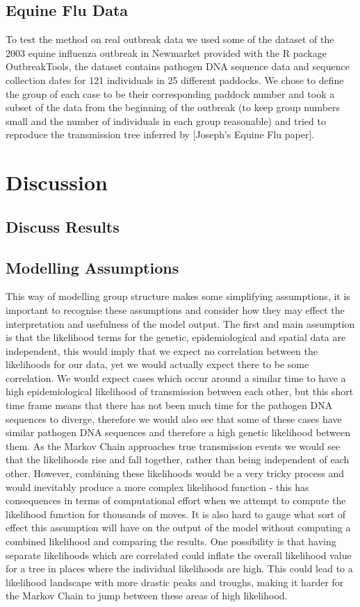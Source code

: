 \documentclass[11pt,a4paper]{report}
\begin{document}
\section{Equine Flu Data}
To test the method on real outbreak data we used some of the dataset of the 2003 equine influenza outbreak in Newmarket provided with the R package OutbreakTools, the dataset contains pathogen DNA sequence data and sequence collection dates for 121 individuals in 25 different paddocks. We chose to define the group of each case to be their corresponding paddock number and took a subset of the data from the beginning of the outbreak (to keep group numbers small and the number of individuals in each group reasonable) and tried to reproduce the transmission tree inferred by [Joseph’s Equine Flu paper].



\chapter{Discussion}
\section{Discuss Results}
\section{Modelling Assumptions}
This way of modelling group structure makes some simplifying assumptions, it is important to recognise these assumptions and consider how they may effect the interpretation and usefulness of the model output. The first and main assumption is that the likelihood terms for the genetic, epidemiological and spatial data are independent, this would imply that we expect no correlation between the likelihoods for our data, yet we would actually expect there to be some correlation. We would expect cases which occur around a similar time to have a high epidemiological likelihood of transmission between each other, but this short time frame means that there has not been much time for the pathogen DNA sequences to diverge, therefore we would also see that some of these cases have similar pathogen DNA sequences and therefore a high genetic likelihood between them. As the Markov Chain approaches true transmission events we would see that the likelihoods rise and fall together, rather than being independent of each other. However, combining these likelihoods would be a very tricky process and would inevitably produce a more complex likelihood function - this has consequences in terms of computational effort when we attempt to compute the likelihood function for thousands of moves. It is also hard to gauge what sort of effect this assumption will have on the output of the model without computing a combined likelihood and comparing the results. One possibility is that having separate likelihoods which are correlated could inflate the overall likelihood value for a tree in places where the individual likelihoods are high. This could lead to a likelihood landscape with more drastic peaks and troughs, making it harder for the Markov Chain to jump between these areas of high likelihood.
\end{document}
